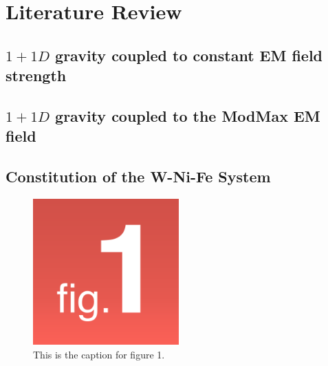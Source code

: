 
\chapter{Literature Review}

\label{Chapter2}


\section{$1+1D$ gravity coupled to constant EM field strength}
\label{castro-paper}

\lipsum[2-4]

\section{$1+1D$ gravity coupled to the ModMax EM field}
\label{drc-hemant-paper}

\lipsum[2-4]


\section{Constitution of the W-Ni-Fe System}

\lipsum[2-4]

\begin{figure}
    \centering
    \includegraphics[width=0.5\textwidth]{Pictures/Figure 1.png}
    \caption{This is the caption for figure 1.}
    \label{figure:chap2_Figure_2}
\end{figure}



